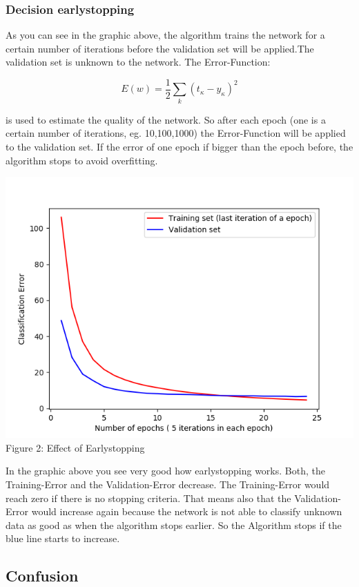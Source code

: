 \documentclass[10pt,a4paper]{article}
\begin{document}
	\subsubsection{Decision earlystopping}		%
	 As you can see in the graphic above, the algorithm trains the network for a certain number of iterations before the validation set will be applied.The validation set is unknown to the network. The Error-Function: \\
	 	\begin{center}
	 	\begin{equation}
	 	E(w) = \frac{1}{2} \sum_{k} (t_{\kappa} - y_{\kappa})^{2}
	 	\end{equation} 
	 \end{center}
 	is used to estimate the quality of the network. So after each epoch (one is a certain number of iterations, eg. 10,100,1000) the Error-Function will be applied to the validation set. If the error of one epoch if bigger than the epoch before, the algorithm stops to avoid overfitting.
 	\begin{center}
 		\includegraphics[width=0.8\linewidth]{pictures/earlystopping}
 		\\Figure 2: Effect of Earlystopping
 	\end{center}
 	In the graphic above you see very good how earlystopping works. Both, the Training-Error and the Validation-Error decrease. The Training-Error would reach zero if there is no stopping criteria. That means also that the Validation-Error would increase again because the network is not able to classify unknown data as good as when the algorithm stops earlier. So the Algorithm stops if the blue line starts to increase. 
 	\subsection{Confusion}					%
 	
	 
\end{document}
